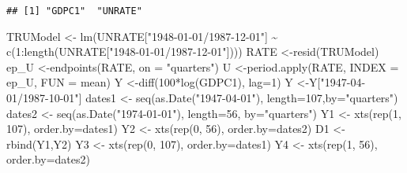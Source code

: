 \documentclass[
]{book}
\newenvironment{Shaded}{\begin{snugshade}}{\end{snugshade}}
\newcommand{\AttributeTok}[1]{\textcolor[rgb]{0.77,0.63,0.00}{#1}}
\newcommand{\DecValTok}[1]{\textcolor[rgb]{0.00,0.00,0.81}{#1}}
\newcommand{\FunctionTok}[1]{\textcolor[rgb]{0.00,0.00,0.00}{#1}}
\newcommand{\NormalTok}[1]{#1}
\newcommand{\OtherTok}[1]{\textcolor[rgb]{0.56,0.35,0.01}{#1}}
\newcommand{\SpecialCharTok}[1]{\textcolor[rgb]{0.00,0.00,0.00}{#1}}
\newcommand{\StringTok}[1]{\textcolor[rgb]{0.31,0.60,0.02}{#1}}
\begin{document}
\begin{verbatim}
## [1] "GDPC1"  "UNRATE"
\end{verbatim}

\begin{Shaded}
\begin{Highlighting}[]
\NormalTok{TRUModel   }\OtherTok{\textless{}{-}} \FunctionTok{lm}\NormalTok{(UNRATE[}\StringTok{"1948{-}01{-}01/1987{-}12{-}01"}\NormalTok{] }\SpecialCharTok{\textasciitilde{}} \FunctionTok{c}\NormalTok{(}\DecValTok{1}\SpecialCharTok{:}\FunctionTok{length}\NormalTok{(UNRATE[}\StringTok{"1948{-}01{-}01/1987{-}12{-}01"}\NormalTok{])))}
\NormalTok{RATE       }\OtherTok{\textless{}{-}}\FunctionTok{resid}\NormalTok{(TRUModel) }
\NormalTok{ep\_U       }\OtherTok{\textless{}{-}}\FunctionTok{endpoints}\NormalTok{(RATE, }\AttributeTok{on =} \StringTok{"quarters"}\NormalTok{)}
\NormalTok{U          }\OtherTok{\textless{}{-}}\FunctionTok{period.apply}\NormalTok{(RATE, }\AttributeTok{INDEX =}\NormalTok{ ep\_U, }\AttributeTok{FUN =}\NormalTok{ mean)}
\NormalTok{Y          }\OtherTok{\textless{}{-}}\FunctionTok{diff}\NormalTok{(}\DecValTok{100}\SpecialCharTok{*}\FunctionTok{log}\NormalTok{(GDPC1), }\AttributeTok{lag=}\DecValTok{1}\NormalTok{)}
\NormalTok{Y          }\OtherTok{\textless{}{-}}\NormalTok{Y[}\StringTok{"1947{-}04{-}01/1987{-}10{-}01"}\NormalTok{]}
\NormalTok{dates1     }\OtherTok{\textless{}{-}} \FunctionTok{seq}\NormalTok{(}\FunctionTok{as.Date}\NormalTok{(}\StringTok{"1947{-}04{-}01"}\NormalTok{), }\AttributeTok{length=}\DecValTok{107}\NormalTok{,}\AttributeTok{by=}\StringTok{"quarters"}\NormalTok{)}
\NormalTok{dates2     }\OtherTok{\textless{}{-}} \FunctionTok{seq}\NormalTok{(}\FunctionTok{as.Date}\NormalTok{(}\StringTok{"1974{-}01{-}01"}\NormalTok{), }\AttributeTok{length=}\DecValTok{56}\NormalTok{, }\AttributeTok{by=}\StringTok{"quarters"}\NormalTok{)}
\NormalTok{Y1         }\OtherTok{\textless{}{-}} \FunctionTok{xts}\NormalTok{(}\FunctionTok{rep}\NormalTok{(}\DecValTok{1}\NormalTok{, }\DecValTok{107}\NormalTok{), }\AttributeTok{order.by=}\NormalTok{dates1)}
\NormalTok{Y2         }\OtherTok{\textless{}{-}} \FunctionTok{xts}\NormalTok{(}\FunctionTok{rep}\NormalTok{(}\DecValTok{0}\NormalTok{,  }\DecValTok{56}\NormalTok{), }\AttributeTok{order.by=}\NormalTok{dates2)}
\NormalTok{D1         }\OtherTok{\textless{}{-}} \FunctionTok{rbind}\NormalTok{(Y1,Y2)}
\NormalTok{Y3         }\OtherTok{\textless{}{-}} \FunctionTok{xts}\NormalTok{(}\FunctionTok{rep}\NormalTok{(}\DecValTok{0}\NormalTok{, }\DecValTok{107}\NormalTok{), }\AttributeTok{order.by=}\NormalTok{dates1)}
\NormalTok{Y4         }\OtherTok{\textless{}{-}} \FunctionTok{xts}\NormalTok{(}\FunctionTok{rep}\NormalTok{(}\DecValTok{1}\NormalTok{,  }\DecValTok{56}\NormalTok{), }\AttributeTok{order.by=}\NormalTok{dates2)}

\end{Highlighting}
\end{Shaded}
\end{document}
